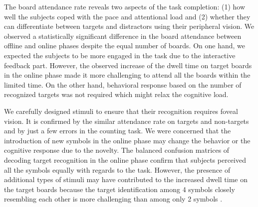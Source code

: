 \documentclass[12pt]{iopart}
\begin{document}
The board attendance rate reveals two aspects of the task completion:
(1) how well the subjects coped with the pace and attentional load
and (2) whether they can differentiate between targets and distractors
using their peripheral vision.
We observed a statistically significant difference in the board attendance
between offline and online phases despite the equal number of boards.
On one hand, we expected the subjects to 
be more engaged in the task due to the interactive feedback part.
However, the observed increase of the dwell time on target boards 
in the online phase made it more challenging to attend all
the boards within the limited time.
On the other hand, behavioral response based on the number of recognized targets
was not required which might relax the cognitive load.

We carefully designed stimuli
to ensure that their recognition requires foveal vision.
It is confirmed by the similar
attendance rate on targets and non-targets and 
by just a few errors in the counting task.
We were concerned that the introduction of new symbols in the online phase
may change the behavior or the cognitive response due to the novelty.
The balanced confusion matrices of decoding target recognition in the online phase
confirm that subjects perceived all the symbols equally with regards
to the task. However, the presence of additional types of stimuli 
may have contributed to the increased dwell time 
on the target boards because the target identification 
among 4 symbols closely resembling each other 
is more challenging than among only 2 symbols
\cite{dick_processing_1971,alegria_time_1970}.
\end{document}
